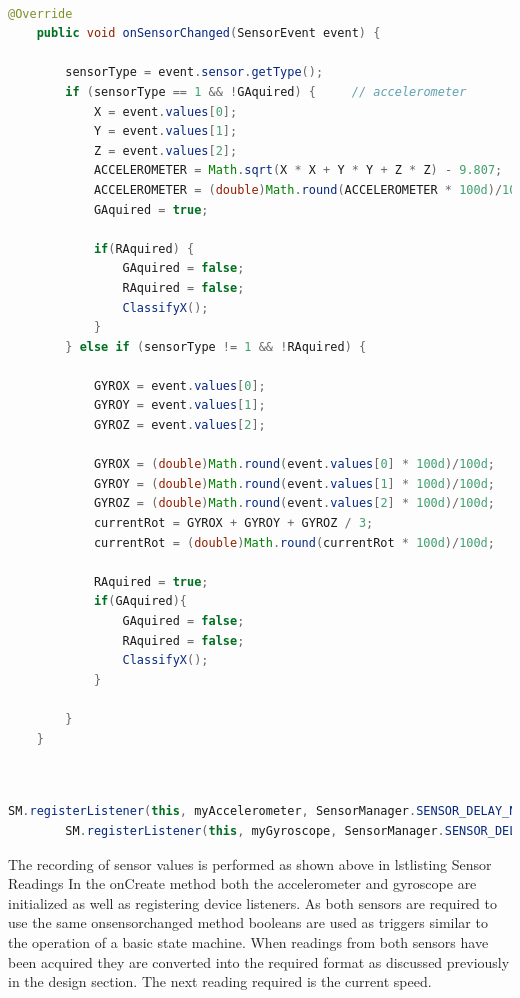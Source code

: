  \begin{lstlisting}[language=Java,basicstyle=\small, breaklines=true, label={lst:labell},caption={Taking Sensor Readings}]

@Override
    public void onSensorChanged(SensorEvent event) {

        sensorType = event.sensor.getType();
        if (sensorType == 1 && !GAquired) {     // accelerometer
            X = event.values[0];
            Y = event.values[1];
            Z = event.values[2];
            ACCELEROMETER = Math.sqrt(X * X + Y * Y + Z * Z) - 9.807;
            ACCELEROMETER = (double)Math.round(ACCELEROMETER * 100d)/100d;
            GAquired = true;

            if(RAquired) {
                GAquired = false;
                RAquired = false;
                ClassifyX();
            }
        } else if (sensorType != 1 && !RAquired) {

            GYROX = event.values[0];
            GYROY = event.values[1];
            GYROZ = event.values[2];

            GYROX = (double)Math.round(event.values[0] * 100d)/100d;
            GYROY = (double)Math.round(event.values[1] * 100d)/100d;
            GYROZ = (double)Math.round(event.values[2] * 100d)/100d;
            currentRot = GYROX + GYROY + GYROZ / 3;
            currentRot = (double)Math.round(currentRot * 100d)/100d;

            RAquired = true;
            if(GAquired){
                GAquired = false;
                RAquired = false;
                ClassifyX();
            }

        }
    }

\end{lstlisting}



 \begin{lstlisting}[language=Java,basicstyle=\small, breaklines=true, label={lst:labell},caption={Senor Setup}]


SM.registerListener(this, myAccelerometer, SensorManager.SENSOR_DELAY_NORMAL);
        SM.registerListener(this, myGyroscope, SensorManager.SENSOR_DELAY_NORMAL);

\end{lstlisting}



The recording of sensor values is performed as shown above in lstlisting Sensor Readings In the onCreate method both the accelerometer and gyroscope are initialized as well as registering device listeners. As both sensors are required to use the same onsensorchanged method booleans are used as triggers similar to the operation of a basic state machine. When readings from both sensors have been acquired they are converted into the required format as discussed previously in the design section. The next reading required is the current speed.


